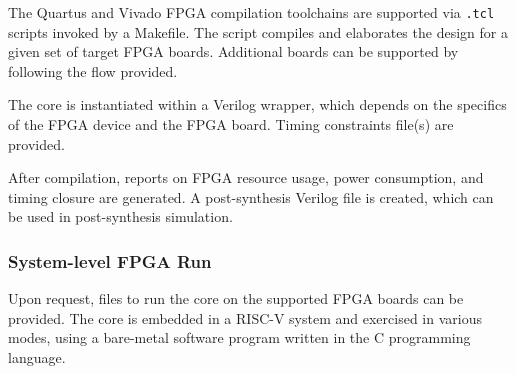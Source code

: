%

The Quartus and Vivado FPGA compilation toolchains are supported via \texttt{.tcl}
scripts invoked by a Makefile. The script compiles and elaborates the design for
a given set of target FPGA boards. Additional boards can be supported by
following the flow provided.

The core is instantiated within a Verilog wrapper, which depends on the
specifics of the FPGA device and the FPGA board. Timing constraints file(s) are
provided.

After compilation, reports on FPGA resource usage, power consumption, and timing
closure are generated. A post-synthesis Verilog file is created, which can be
used in post-synthesis simulation.



\subsubsection*{System-level FPGA Run}

Upon request, files to run the core on the supported FPGA boards can be
provided. The core is embedded in a RISC-V system and exercised in various
modes, using a bare-metal software program written in the C programming
language.
